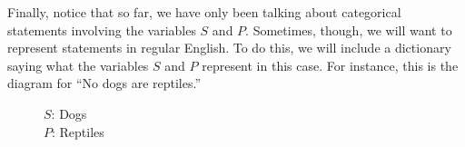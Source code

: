 Finally, notice that so far, we have only been talking about categorical statements involving the variables $S$ and $P$. Sometimes, though, we will want to represent statements in regular English. To do this, we will include a dictionary saying what the variables $S$ and $P$ represent in this case. For instance, this is the diagram for ``No dogs are reptiles.''

\begin{figure}[H]
\begin{center}
\captionsetup{singlelinecheck=on}
\caption*{$S$: Dogs \\ $P$: Reptiles}
\end{center}
\end{figure}



